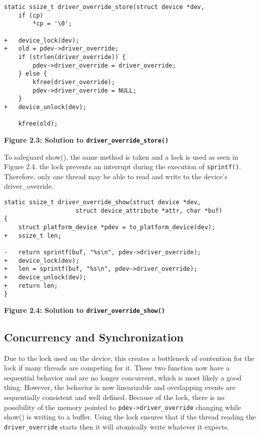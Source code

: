 \documentclass[12pt]{article}
\begin{document}
%
% 

\newpage
\begin{lstlisting}[style=CStyle]
static ssize_t driver_override_store(struct device *dev,
 	if (cp)
 		*cp = '\0';
 
+	device_lock(dev);
+	old = pdev->driver_override;
 	if (strlen(driver_override)) {
 		pdev->driver_override = driver_override;
 	} else {
 		kfree(driver_override);
 		pdev->driver_override = NULL;
 	}
+	device_unlock(dev);
 
 	kfree(old);
\end{lstlisting}
\centerline{\textbf{Figure 2.3: Solution to \texttt{driver\_override\_store()}}}
\vspace{12pt}

To safeguard show(), the same method is taken and a lock is used as seen in Figure 2.4. the lock prevents an interrupt during the execution of \texttt{sprintf()}. Therefore, only one thread may be able to read and write to the device's driver\_override.
\begin{lstlisting}[style=CStyle]
static ssize_t driver_override_show(struct device *dev,
 				    struct device_attribute *attr, char *buf)
{
 	struct platform_device *pdev = to_platform_device(dev);
+	ssize_t len;
 
-	return sprintf(buf, "%s\n", pdev->driver_override);
+	device_lock(dev);
+	len = sprintf(buf, "%s\n", pdev->driver_override);
+	device_unlock(dev);
+	return len;
}
\end{lstlisting}
\centerline{\textbf{Figure 2.4: Solution to \texttt{driver\_override\_show()}}}
\vspace{12pt}

\subsection{Concurrency and Synchronization}
Due to the lock used on the device, this creates a bottleneck of contention for the lock if many threads are competing for it. These two function now have a sequential behavior and are no longer concurrent, which is most likely a good thing. However, the behavior is now linearizable and overlapping events are sequentially consistent and well defined. Because of the lock, there is no possibility of the memory pointed to \texttt{pdev->driver\_override} changing while show() is writing to a buffer. Using the lock ensures that if the thread reading the \texttt{driver\_override} starts then it will atomically write whatever it expects. 
\end{document}
